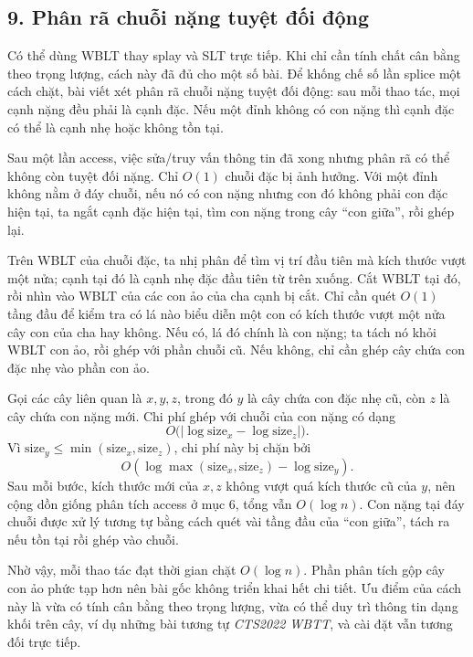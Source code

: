 \documentclass[11pt]{article}
\begin{document}
\subsection*{9. Phân rã chuỗi nặng tuyệt đối động}

Có thể dùng WBLT thay splay và SLT trực tiếp. Khi chỉ cần tính chất cân bằng
theo trọng lượng, cách này đã đủ cho một số bài. Để khống chế số lần splice
một cách chặt, bài viết xét phân rã chuỗi nặng tuyệt đối động: sau mỗi thao
tác, mọi cạnh nặng đều phải là cạnh đặc. Nếu một đỉnh không có con nặng thì
cạnh đặc có thể là cạnh nhẹ hoặc không tồn tại.

Sau một lần access, việc sửa/truy vấn thông tin đã xong nhưng phân rã có thể
không còn tuyệt đối nặng. Chỉ \(O(1)\) chuỗi đặc bị ảnh hưởng. Với một đỉnh
không nằm ở đáy chuỗi, nếu nó có con nặng nhưng con đó không phải con đặc hiện
tại, ta ngắt cạnh đặc hiện tại, tìm con nặng trong cây ``con giữa'', rồi ghép
lại.

Trên WBLT của chuỗi đặc, ta nhị phân để tìm vị trí đầu tiên mà kích thước vượt
một nửa; cạnh tại đó là cạnh nhẹ đặc đầu tiên từ trên xuống. Cắt WBLT tại đó,
rồi nhìn vào WBLT của các con ảo của cha cạnh bị cắt. Chỉ cần quét \(O(1)\)
tầng đầu để kiểm tra có lá nào biểu diễn một con có kích thước vượt một nửa cây
con của cha hay không. Nếu có, lá đó chính là con nặng; ta tách nó khỏi WBLT
con ảo, rồi ghép với phần chuỗi cũ. Nếu không, chỉ cần ghép cây chứa con đặc
nhẹ vào phần con ảo.

Gọi các cây liên quan là \(x,y,z\), trong đó \(y\) là cây chứa con đặc nhẹ cũ,
còn \(z\) là cây chứa con nặng mới. Chi phí ghép với chuỗi của con nặng có dạng
\[
  O\bigl(|\log \mathrm{size}_x-\log \mathrm{size}_z|\bigr).
\]
Vì \(\mathrm{size}_y\le\min(\mathrm{size}_x,\mathrm{size}_z)\), chi phí này bị
chặn bởi
\[
  O(\log\max(\mathrm{size}_x,\mathrm{size}_z)-\log \mathrm{size}_y).
\]
Sau mỗi bước, kích thước mới của \(x,z\) không vượt quá kích thước cũ của
\(y\), nên cộng dồn giống phân tích access ở mục 6, tổng vẫn \(O(\log n)\).
Con nặng tại đáy chuỗi được xử lý tương tự bằng cách quét vài tầng đầu của
``con giữa'', tách ra nếu tồn tại rồi ghép vào chuỗi.

Nhờ vậy, mỗi thao tác đạt thời gian chặt \(O(\log n)\). Phần phân tích gộp cây
con ảo phức tạp hơn nên bài gốc không triển khai hết chi tiết. Ưu điểm của
cách này là vừa có tính cân bằng theo trọng lượng, vừa có thể duy trì thông tin
dạng khối trên cây, ví dụ những bài tương tự \emph{CTS2022 WBTT}, và cài đặt
vẫn tương đối trực tiếp.
\end{document}
